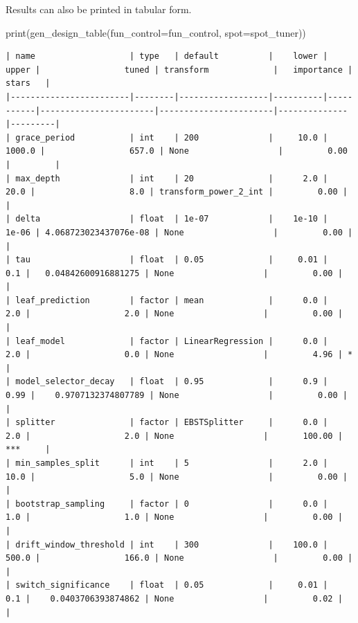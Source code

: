 \documentclass[
  letterpaper,
  DIV=11,
  numbers=noendperiod]{scrreprt}
\newenvironment{Shaded}{\begin{snugshade}}{\end{snugshade}}
\newcommand{\BuiltInTok}[1]{\textcolor[rgb]{0.00,0.23,0.31}{#1}}
\newcommand{\NormalTok}[1]{\textcolor[rgb]{0.00,0.23,0.31}{#1}}
\newcommand{\OperatorTok}[1]{\textcolor[rgb]{0.37,0.37,0.37}{#1}}
\begin{document}
Results can also be printed in tabular form.

\begin{Shaded}
\begin{Highlighting}[]
\BuiltInTok{print}\NormalTok{(gen\_design\_table(fun\_control}\OperatorTok{=}\NormalTok{fun\_control, spot}\OperatorTok{=}\NormalTok{spot\_tuner))}
\end{Highlighting}
\end{Shaded}

\begin{verbatim}
| name                   | type   | default          |    lower |     upper |                 tuned | transform             |   importance | stars   |
|------------------------|--------|------------------|----------|-----------|-----------------------|-----------------------|--------------|---------|
| grace_period           | int    | 200              |     10.0 |    1000.0 |                 657.0 | None                  |         0.00 |         |
| max_depth              | int    | 20               |      2.0 |      20.0 |                   8.0 | transform_power_2_int |         0.00 |         |
| delta                  | float  | 1e-07            |    1e-10 |     1e-06 | 4.068723023437076e-08 | None                  |         0.00 |         |
| tau                    | float  | 0.05             |     0.01 |       0.1 |   0.04842600916881275 | None                  |         0.00 |         |
| leaf_prediction        | factor | mean             |      0.0 |       2.0 |                   2.0 | None                  |         0.00 |         |
| leaf_model             | factor | LinearRegression |      0.0 |       2.0 |                   0.0 | None                  |         4.96 | *       |
| model_selector_decay   | float  | 0.95             |      0.9 |      0.99 |    0.9707132374807789 | None                  |         0.00 |         |
| splitter               | factor | EBSTSplitter     |      0.0 |       2.0 |                   2.0 | None                  |       100.00 | ***     |
| min_samples_split      | int    | 5                |      2.0 |      10.0 |                   5.0 | None                  |         0.00 |         |
| bootstrap_sampling     | factor | 0                |      0.0 |       1.0 |                   1.0 | None                  |         0.00 |         |
| drift_window_threshold | int    | 300              |    100.0 |     500.0 |                 166.0 | None                  |         0.00 |         |
| switch_significance    | float  | 0.05             |     0.01 |       0.1 |    0.0403706393874862 | None                  |         0.02 |         |

\end{verbatim}
\end{document}
